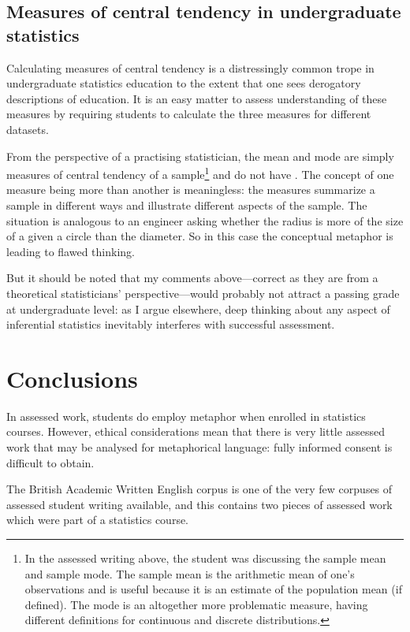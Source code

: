 \subsection{Measures of central tendency in undergraduate statistics}

Calculating measures of central tendency is a distressingly common
trope in undergraduate statistics education to the extent that one
sees derogatory descriptions of  education.
It is an easy matter to assess understanding of these measures by
requiring students to calculate the three measures for different
datasets.

From the perspective of a practising statistician, the mean and mode
are simply measures of central tendency of a sample\footnote{In the
  assessed writing above, the student was discussing the sample mean
  and sample mode.  The sample mean is the arithmetic mean of one's
  observations and is useful because it is an estimate of the
  population mean (if defined).  The mode is an altogether more
  problematic measure, having different definitions for continuous and
  discrete distributions.} and do not have .  The
concept of one measure being more  than
another is meaningless: the measures summarize a sample in different
ways and illustrate different aspects of the sample.  The situation is
analogous to an engineer asking whether the radius is more
 of the size of a given a circle than the
diameter.  So in this case the conceptual metaphor  is leading to flawed thinking.

But it should be noted that my comments above---correct as they are
from a theoretical statisticians' perspective---would probably not
attract a passing grade at undergraduate level: as I argue elsewhere,
deep thinking about any aspect of inferential statistics inevitably
interferes with successful assessment.

\section{Conclusions}

In assessed work, students do employ metaphor when enrolled in
statistics courses.  However, ethical considerations mean that there
is very little assessed work that may be analysed for metaphorical
language: fully informed consent is difficult to obtain.

The British Academic Written English corpus is one of the very few
corpuses of assessed student writing available, and this contains two
pieces of assessed work which were part of a statistics course.

